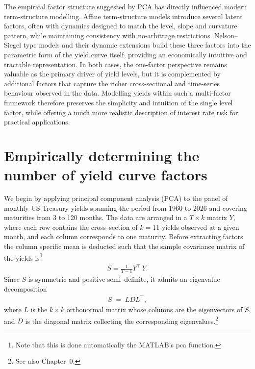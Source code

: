 \documentclass[
  letterpaper,
  DIV=11,
  numbers=noendperiod]{scrreprt}
\begin{document}
The empirical factor structure suggested by PCA has directly influenced
modern term‑structure modelling. Affine term‑structure models introduce
several latent factors, often with dynamics designed to match the level,
slope and curvature pattern, while maintaining consistency with
no‑arbitrage restrictions. Nelson--Siegel type models and their dynamic
extensions build these three factors into the parametric form of the
yield curve itself, providing an economically intuitive and tractable
representation. In both cases, the one‑factor perspective remains
valuable as the primary driver of yield levels, but it is complemented
by additional factors that capture the richer cross‑sectional and
time‑series behaviour observed in the data. Modelling yields within such
a multi‑factor framework therefore preserves the simplicity and
intuition of the single level factor, while offering a much more
realistic description of interest rate risk for practical applications.

\section{Empirically determining the number of yield curve
factors}\label{empirically-determining-the-number-of-yield-curve-factors}

We begin by applying principal component analysis (PCA) to the panel of
monthly US Treasury yields spanning the period from 1960 to 2026 and
covering maturities from 3 to 120 months. The data are arranged in a
\(T\times k\) matrix \(Y\), where each row contains the cross--section
of \(k=11\) yields observed at a given month, and each column
corresponds to one maturity. Before extracting factors the column
specific mean is deducted such that the sample covariance matrix of the
yields is\footnote{Note that this is done automatically the MATLAB's pca
  function.}
\begin{align}
    S = \frac{1}{T-1} Y^{\top}\, Y.
\end{align}
Since \(S\) is symmetric and positive semi--definite, it admits an
eigenvalue decomposition
\begin{align}
    S \;=\; L D L^{\top},
\end{align}
where \(L\) is the \(k\times k\) orthonormal matrix whose columns are
the eigenvectors of \(S\), and \(D\) is the diagonal matrix collecting
the corresponding eigenvalues.\footnote{See also Chapter~0.}
\end{document}
